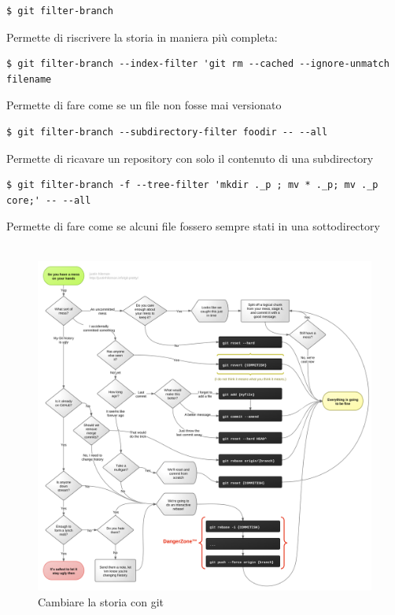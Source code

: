 \begin{verbatim}
$ git filter-branch
\end{verbatim}
Permette di riscrivere la storia in maniera più completa:
 \begin{verbatim}
$ git filter-branch --index-filter 'git rm --cached --ignore-unmatch filename
\end{verbatim}
Permette di fare come se un file non fosse mai versionato
\begin{verbatim}
$ git filter-branch --subdirectory-filter foodir -- --all
\end{verbatim}
Permette di ricavare un repository con solo il contenuto di una subdirectory
\begin{verbatim}
$ git filter-branch -f --tree-filter 'mkdir ._p ; mv * ._p; mv ._p core;' -- --all
\end{verbatim}
Permette di fare come se alcuni file fossero sempre stati in una sottodirectory\\\\

\begin{figure}[H]
	\begin{center}
    	 \includegraphics[scale=0.55]{img/git-pretty.png}
    	 \caption{Cambiare la storia con git}
 	\end{center}
\end{figure}

